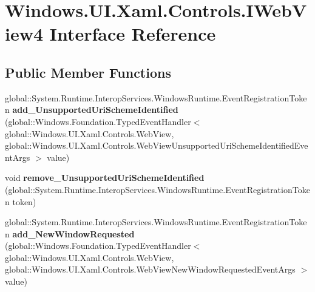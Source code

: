 \hypertarget{interface_windows_1_1_u_i_1_1_xaml_1_1_controls_1_1_i_web_view4}{}\section{Windows.\+U\+I.\+Xaml.\+Controls.\+I\+Web\+View4 Interface Reference}
\label{interface_windows_1_1_u_i_1_1_xaml_1_1_controls_1_1_i_web_view4}
\subsection*{Public Member Functions}
\begin{DoxyCompactItemize}
\item 
\mbox{\label{interface_windows_1_1_u_i_1_1_xaml_1_1_controls_1_1_i_web_view4_a6e70ca803e5cf51c343058bd94efe3cb}} 
global\+::\+System.\+Runtime.\+Interop\+Services.\+Windows\+Runtime.\+Event\+Registration\+Token {\bfseries add\+\_\+\+Unsupported\+Uri\+Scheme\+Identified} (global\+::\+Windows.\+Foundation.\+Typed\+Event\+Handler$<$ global\+::\+Windows.\+U\+I.\+Xaml.\+Controls.\+Web\+View, global\+::\+Windows.\+U\+I.\+Xaml.\+Controls.\+Web\+View\+Unsupported\+Uri\+Scheme\+Identified\+Event\+Args $>$ value)
\item 
\mbox{\label{interface_windows_1_1_u_i_1_1_xaml_1_1_controls_1_1_i_web_view4_a434db913b569c214fdd8ee1886fb3295}} 
void {\bfseries remove\+\_\+\+Unsupported\+Uri\+Scheme\+Identified} (global\+::\+System.\+Runtime.\+Interop\+Services.\+Windows\+Runtime.\+Event\+Registration\+Token token)
\item 
\mbox{\label{interface_windows_1_1_u_i_1_1_xaml_1_1_controls_1_1_i_web_view4_a31260436a1ad23171cfab6d9aa36d4d0}} 
global\+::\+System.\+Runtime.\+Interop\+Services.\+Windows\+Runtime.\+Event\+Registration\+Token {\bfseries add\+\_\+\+New\+Window\+Requested} (global\+::\+Windows.\+Foundation.\+Typed\+Event\+Handler$<$ global\+::\+Windows.\+U\+I.\+Xaml.\+Controls.\+Web\+View, global\+::\+Windows.\+U\+I.\+Xaml.\+Controls.\+Web\+View\+New\+Window\+Requested\+Event\+Args $>$ value)
\item 
\mbox{\label{interface_windows_1_1_u_i_1_1_xaml_1_1_controls_1_1_i_web_view4_a06f4976e0ae89feefa9ca60a799e7301}} 

\end{DoxyCompactItemize}
